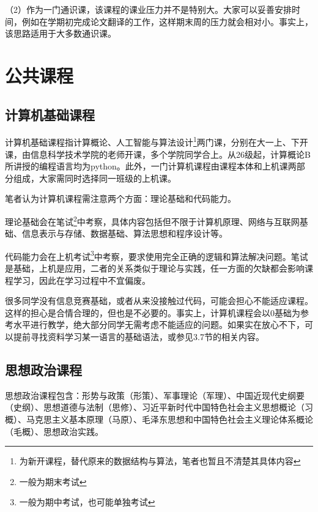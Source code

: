 \documentclass[11pt,oneside]{book}
\begin{document}
（2）作为一门通识课，该课程的课业压力并不是特别大。大家可以妥善安排时间，例如在学期初完成论文翻译的工作，这样期末周的压力就会相对小。事实上，该思路适用于大多数通识课。

\section{公共课程}
\subsection{计算机基础课程}

计算机基础课程指计算概论、人工智能与算法设计\footnote{为新开课程，替代原来的数据结构与算法，笔者也暂且不清楚其具体内容}两门课，分别在大一上、下开课，由信息科学技术学院的老师开课，多个学院同学合上。从26级起，计算概论B所讲授的编程语言均为python。此外，一门计算机课程由课程本体和上机课两部分组成，大家需同时选择同一班级的上机课。

\vspace{10pt}

笔者认为计算机课程需注意两个方面：理论基础和代码能力。

\vspace{10pt}

理论基础会在笔试\footnote{一般为期末考试}中考察，具体内容包括但不限于计算机原理、网络与互联网基础、信息表示与存储、数据基础、算法思想和程序设计等。

\vspace{10pt}

代码能力会在上机考试\footnote{一般为期中考试，也可能单独考试}中考察，要求使用完全正确的逻辑和算法解决问题。笔试是基础，上机是应用，二者的关系类似于理论与实践，任一方面的欠缺都会影响课程学习，因此在学习过程中不宜偏废。

\vspace{10pt}

很多同学没有信息竞赛基础，或者从来没接触过代码，可能会担心不能适应课程。这样的担心是合情合理的，但也是不必要的。事实上，计算机课程会以0基础为参考水平进行教学，绝大部分同学无需考虑不能适应的问题。如果实在放心不下，可以提前寻找资料学习某一语言的基础语法，或参见3.7节的相关内容。

\subsection{思想政治课程}
思想政治课程包含：形势与政策（形策）、军事理论（军理）、中国近现代史纲要（史纲）、思想道德与法制（思修）、习近平新时代中国特色社会主义思想概论（习概）、马克思主义基本原理（马原）、毛泽东思想和中国特色社会主义理论体系概论（毛概）、思想政治实践。
\end{document}
